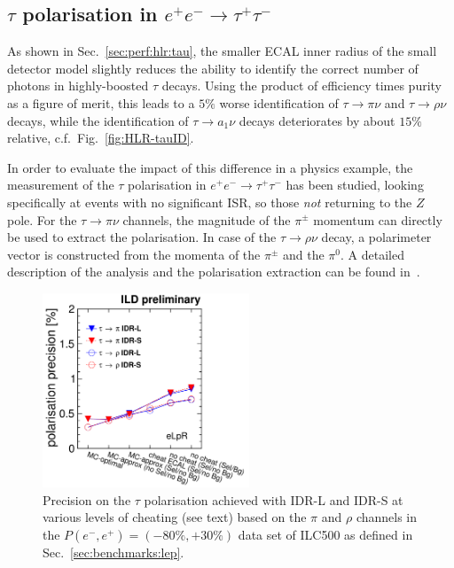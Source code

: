 \subsection{\texorpdfstring{$\tau$}{Tau} polarisation \texorpdfstring{in $e^+e^- \to \tau^+\tau^-$}{in e+e- -> tau tau}}

As shown in Sec.~\ref{sec:perf:hlr:tau}, the smaller ECAL inner radius of the small detector model slightly reduces the ability to identify the correct number of photons in
highly-boosted $\tau$ decays. Using the product of efficiency times purity as a figure of merit, this leads to a $5\%$ worse identification of $\tau \to \pi \nu$ and $\tau \to \rho \nu$ decays, while the identification of $\tau \to a_1 \nu$ decays deteriorates by about $15\%$ relative, c.f.\ Fig.~\ref{fig:HLR-tauID}. 

In order to evaluate the impact of this difference in a physics example, the measurement of the $\tau$ polarisation in $e^+e^- \to \tau^+\tau^-$ has been studied, looking specifically at events with no significant ISR, so those {\em not} returning to the $Z$ pole. For the $\tau \to \pi \nu$ channels, the magnitude of the $\pi^{\pm}$ momentum can directly be used to extract the polarisation. In case of the $\tau \to \rho \nu$ decay, a polarimeter vector is constructed from the momenta of the $\pi^{\pm}$ and the $\pi^0$. A detailed description of the analysis and the polarisation extraction can be found in~\cite{ILDNote:tautau}.

\begin{figure}[htbp]
\begin{center}
 \includegraphics[width=0.55\textwidth]{Performance/fig/drawpexpresults0-update.pdf}
\end{center}
\caption{Precision on the $\tau$ polarisation achieved with IDR-L and IDR-S at various levels of cheating (see text) based on the $\pi$ and $\rho$ channels in the $P(e^-,e^+)=(-80\%,+30\%)$ data set of ILC500 as defined in Sec.~\ref{sec:benchmarks:lep}.}
\label{fig:tautau:taupol}
\end{figure}

